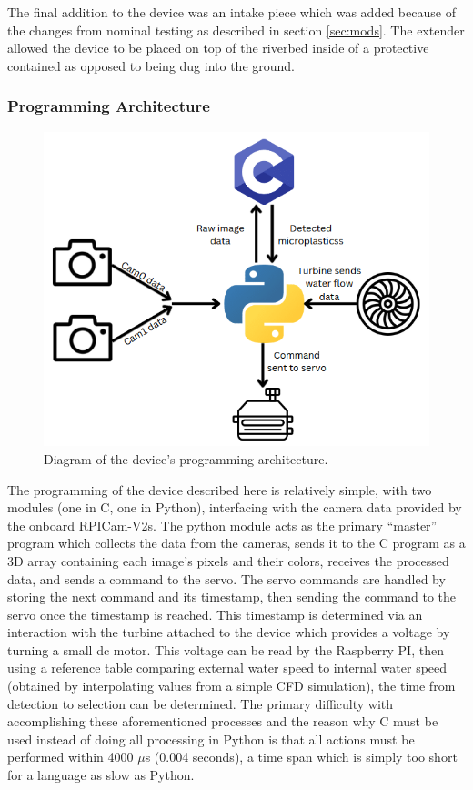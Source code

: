 \documentclass[fleqn,10pt]{SelfArx} %
\begin{document}
	
	The final addition to the device was an intake piece which was added because of the changes from nominal testing as described in section \ref{sec:mods}. The extender allowed the device to be placed on top of the riverbed inside of a protective contained as opposed to being dug into the ground. 
	
	
	
	\subsubsection{Programming Architecture}\label{sec:programmingArch}
	\begin{figure}[h]
		\centering
		\includegraphics[width=1\linewidth]{Figures/ProgrammingArch}
		\caption[Programming Architecture Diagram]{Diagram of the device's programming architecture.}
		\label{fig:ProgArch}
	\end{figure} 
	The programming of the device described here is relatively simple, with two modules (one in C, one in Python), interfacing with the camera data provided by the onboard \gls{RPI}Cam-V2s. The python module acts as the primary “master” program which collects the data from the cameras, sends it to the C program as a 3D array containing each image’s pixels and their colors, receives the processed data, and sends a command to the servo. The servo commands are handled by storing the next command and its timestamp, then sending the command to the servo once the timestamp is reached. This timestamp is determined via an interaction with the turbine attached to the device which provides a voltage by turning a small dc motor. This voltage can be read by the Raspberry PI, then using a reference table comparing external water speed to internal water speed (obtained by interpolating values from a simple CFD simulation), the time from detection to selection can be determined. The primary difficulty with accomplishing these aforementioned processes and the reason why C must be used instead of doing all processing in Python is that all actions must be performed within 4000 $\mu$s (0.004 seconds), a time span which is simply too short for a language as slow as Python. 
	
\end{document}
